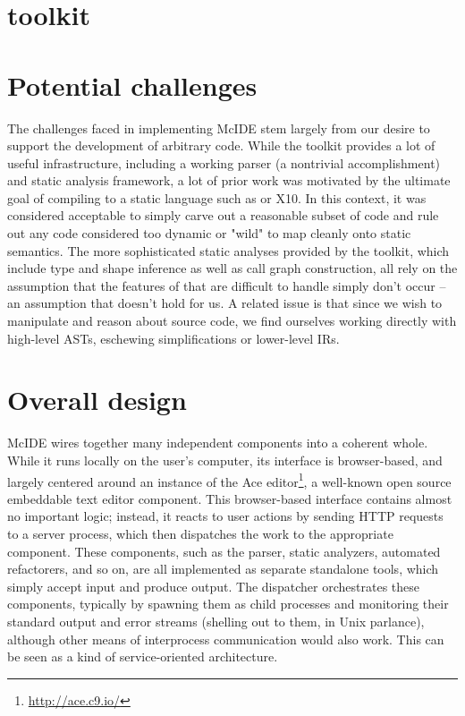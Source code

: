 \section{\mclab toolkit}

\section{Potential challenges}

The challenges faced in implementing McIDE stem largely from our desire to
support the development of arbitrary \matlab code. While the \mclab toolkit
provides a lot of useful infrastructure, including a working \matlab parser (a
nontrivial accomplishment) and static analysis framework, a lot of prior work
was motivated by the ultimate goal of compiling \matlab to a static language
such as \fortran or X10. In this context, it was considered acceptable to
simply carve out a reasonable subset of \matlab code and rule out any code
considered too dynamic or "wild" to map cleanly onto static semantics. The more
sophisticated static analyses provided by the \mclab toolkit, which include
type and shape inference as well as call graph construction, all rely on the
assumption that the features of \matlab that are difficult to handle simply
don't occur -- an assumption that doesn't hold for us. A related issue is that
since we wish to manipulate and reason about \matlab source code, we find
ourselves working directly with high-level ASTs, eschewing simplifications or
lower-level IRs.

\section{Overall design}

McIDE wires together many independent components into a coherent whole. While
it runs locally on the user's computer, its interface is browser-based, and
largely centered around an instance of the Ace
editor\footnote{\url{http://ace.c9.io/}}, a well-known open source embeddable
text editor component. This browser-based interface contains almost no
important logic; instead, it reacts to user actions by sending HTTP requests to
a server process, which then dispatches the work to the appropriate component.
These components, such as the parser, static analyzers, automated refactorers,
and so on, are all implemented as separate standalone tools, which simply
accept input and produce output. The dispatcher orchestrates these components,
typically by spawning them as child processes and monitoring their standard
output and error streams (shelling out to them, in Unix parlance), although
other means of interprocess communication would also work. This can be seen as
a kind of service-oriented architecture.

